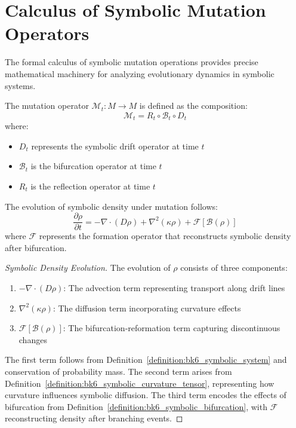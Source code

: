\section{Calculus of Symbolic Mutation Operators}
\label{sec:bk6_calculus_of_symbolic_mutation_operators}
The formal calculus of symbolic mutation operations provides precise mathematical machinery for analyzing evolutionary dynamics in symbolic systems.
\begin{definition}
\label{definition:bk6_mutation_operator}
The mutation operator $\mathcal{M}_t: M \to M$ is defined as the composition:
\begin{equation}
\mathcal{M}_t = R_t \circ \mathcal{B}_t \circ D_t
\end{equation}
where:
\begin{itemize}
\item $D_t$ represents the symbolic drift operator at time $t$
\item $\mathcal{B}_t$ is the bifurcation operator at time $t$
\item $R_t$ is the reflection operator at time $t$
\end{itemize}
\end{definition}
\begin{theorem}
\label{theorem:bk6_symbolic_density_evolution}
The evolution of symbolic density under mutation follows:
\begin{equation}
\frac{\partial \rho}{\partial t} = -\nabla \cdot (D \rho) + \nabla^2(\kappa \rho) + \mathcal{F}[\mathcal{B}(\rho)]
\end{equation}
where $\mathcal{F}$ represents the formation operator that reconstructs symbolic density after bifurcation.
\begin{proof}[Symbolic Density Evolution]
\label{proof:bk6_symbolic_density_evolution}
The evolution of $\rho$ consists of three components:
\begin{enumerate}
\item $-\nabla \cdot (D \rho)$: The advection term representing transport along drift lines
\item $\nabla^2(\kappa \rho)$: The diffusion term incorporating curvature effects
\item $\mathcal{F}[\mathcal{B}(\rho)]$: The bifurcation-reformation term capturing discontinuous changes
\end{enumerate}
The first term follows from Definition~\ref{definition:bk6_symbolic_system} and conservation of probability mass.  
The second term arises from Definition~\ref{definition:bk6_symbolic_curvature_tensor}, representing how curvature influences symbolic diffusion.  
The third term encodes the effects of bifurcation from Definition~\ref{definition:bk6_symbolic_bifurcation}, with $\mathcal{F}$ reconstructing density after branching events.
\end{proof}
\end{theorem}
